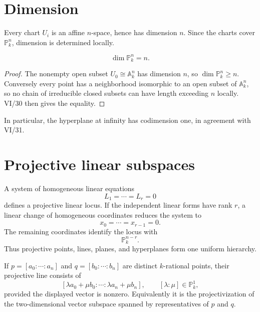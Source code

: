 

\section{Dimension}
Every chart \(U_i\) is an affine \(n\)-space, hence has dimension \(n\).  Since the charts cover \(\mathbb P^n_k\), dimension is determined locally.

\begin{theorem}\label{thm:vi36-dimension}
\[
\boxed{\dim\mathbb P^n_k=n.}
\]
\end{theorem}

\begin{proof}
The nonempty open subset \(U_0\cong\mathbb A^n_k\) has dimension \(n\), so \(\dim\mathbb P^n_k\ge n\).  Conversely every point has a neighborhood isomorphic to an open subset of \(\mathbb A^n_k\), so no chain of irreducible closed subsets can have length exceeding \(n\) locally.  VI/30 then gives the equality.
\end{proof}

In particular, the hyperplane at infinity has codimension one, in agreement with VI/31.

\section{Projective linear subspaces}
A system of homogeneous linear equations
\[
L_1=\cdots=L_r=0
\]
defines a projective linear locus.  If the independent linear forms have rank \(r\), a linear change of homogeneous coordinates reduces the system to
\[
x_0=\cdots=x_{r-1}=0.
\]
The remaining coordinates identify the locus with
\[
\mathbb P^{n-r}_k.
\]
Thus projective points, lines, planes, and hyperplanes form one uniform hierarchy.

\begin{proposition}
If \(p=[a_0:\cdots:a_n]\) and \(q=[b_0:\cdots:b_n]\) are distinct \(k\)-rational points, their projective line consists of
\[
[\lambda a_0+\mu b_0:\cdots:\lambda a_n+\mu b_n],
\qquad [\lambda:\mu]\in\mathbb P^1_k,
\]
provided the displayed vector is nonzero.  Equivalently it is the projectivization of the two-dimensional vector subspace spanned by representatives of \(p\) and \(q\).
\end{proposition}



